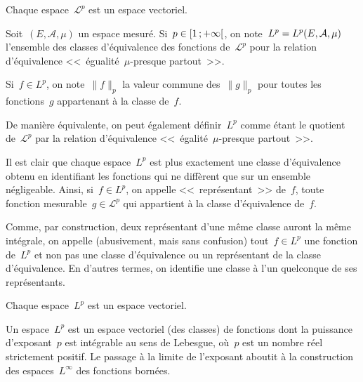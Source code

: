 \begin{theoreme}
Chaque espace~$\mathcal{L}^p$ est un espace vectoriel.
\end{theoreme}

\begin{definition}[Espace~$L^p$]
Soit~$(E,\mathcal{A},\mu)$ un espace mesuré.
Si~$\colorred p\in\intfo{1}{+\infty}$, on note~$\colorblue L^p=L^p(E,\mathcal{A},\mu)$ l'ensemble des
classes d'équivalence des fonctions de~$\mathcal{L}^p$ pour la relation d'équivalence
<<~égualité~$\mu$-presque partout~>>.

Si~$f\in L^p$, on note~$\|f\|_p$ la valeur commune des~$\| g\| _p$ pour toutes les fonctions~$g$
appartenant à la classe de~$f$.
\end{definition}

De manière équivalente, on peut également définir~$L^p$ comme étant le quotient
de~$\mathcal{L}^p$ par la relation d'équivalence <<~égalité~$\mu$-presque partout~>>.

\medskip
Il est clair que chaque espace~$L^p$ est plus exactement une classe d'équivalence obtenu en
identifiant les fonctions qui ne diffèrent que sur un ensemble négligeable.
Ainsi, si~$f\in L^p$, on appelle <<~représentant~>> de~$f$, toute fonction mesurable~$g\in\mathcal{L}^p$
qui appartient à la classe d'équivalence de~$f$.

Comme, par construction, deux représentant d'une même classe auront la même intégrale, on
appelle (abusivement, mais sans confusion) tout~$f\in L^p$ une fonction de~$L^p$ et non pas une classe 
d'équivalence ou un représentant de la classe d'équivalence.
En d'autres termes, on identifie une classe à l'un quelconque de ses représentants.

\medskip
{}

\begin{theoreme}
Chaque espace~$L^p$ est un espace vectoriel.
\end{theoreme}

Un espace~$L^p$ est un espace vectoriel (des classes) de fonctions dont la puissance d'exposant~$p$ est
intégrable au sens de Lebesgue, où~$p$ est un nombre réel strictement positif.
Le passage à la limite de l'exposant aboutit à la construction des espaces~$L^\infty$ des fonctions
bornées.

